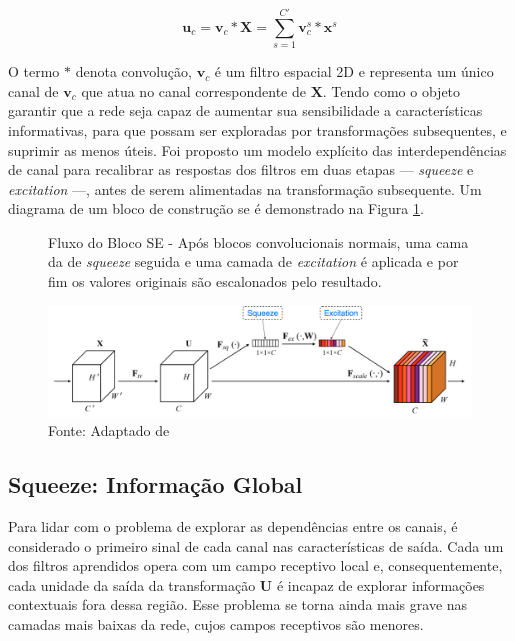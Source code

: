 \begin{equation}
\mathbf{u}_c = \mathbf{v}_c \ast \mathbf{X} = \sum_{s=1}^{C'} \mathbf{v}_c^s \ast \mathbf{x}^s
\label{eq:se}
\end{equation}

O termo $\ast$ denota convolução, $\mathbf{v}_c$ é um filtro espacial 2D e representa um único canal de $\mathbf{v}_c$ que atua no canal correspondente de $\mathbf{X}$. 
Tendo como o objeto garantir que a rede seja capaz de aumentar sua sensibilidade a características informativas, para que possam ser exploradas por transformações subsequentes, e suprimir as menos úteis. Foi proposto um modelo explícito das interdependências de canal para recalibrar as respostas dos filtros em duas etapas — \textit{squeeze} e \textit{excitation} —, antes de serem alimentadas na transformação subsequente. Um diagrama de um bloco de construção \gls{se} é demonstrado na Figura \ref{fig:fig025}.

\begin{figure}[h!]
    \caption{Fluxo do Bloco SE - Após blocos convolucionais normais, uma cama da de \textit{squeeze} seguida e uma camada de \textit{excitation} é aplicada e por fim os valores originais são escalonados pelo resultado.}
    \includegraphics[height=0.27\textwidth]{figures/fig025.png}
    \caption*{Fonte: Adaptado de \cite{huSqueezeandExcitationNetworks2018}}
    \label{fig:fig025}
\end{figure}


\subsection{Squeeze: Informação Global}
\label{subsec:squeeze}

Para lidar com o problema de explorar as dependências entre os canais, é considerado o primeiro sinal de cada canal nas características de saída. Cada um dos filtros aprendidos opera com um campo receptivo local e, consequentemente, cada unidade da saída da transformação $\mathbf{U}$ é incapaz de explorar informações contextuais fora dessa região. Esse problema se torna ainda mais grave nas camadas mais baixas da rede, cujos campos receptivos são menores.

